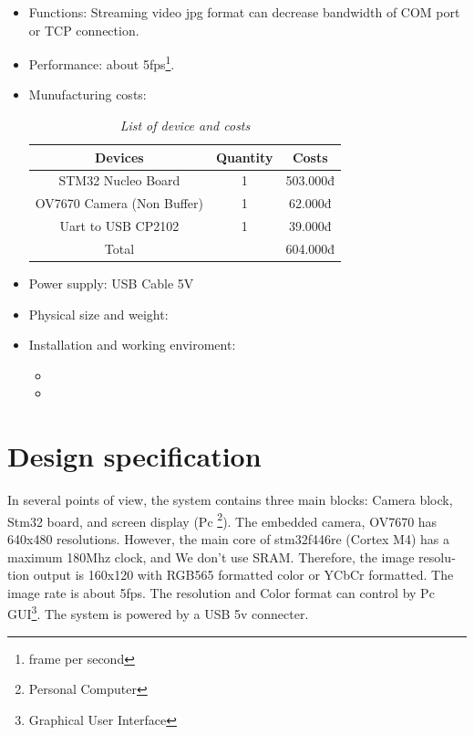 \documentclass[D:/Latex/Internship/Report/Latex/Report.tex]{subfiles}
\begin{document}
\begin{otherlanguage}{english}
\begin{itemize}
					\item Functions: Streaming video jpg format can decrease bandwidth of COM port or TCP connection.

					\item Performance: about 5fps{\footnote {frame per second}}.
					\item Munufacturing costs: 
					\vspace{0.2cm}
					\begin{table}[h!]
						\label{tab:listofdevice}
						\centering
						\large
						\caption{\it List of device and costs}
						\vspace{12pt}
							\begin{tabular}{|c | c | c|}
								\hline 
								Devices & Quantity & Costs \\
								\hline
								STM32 Nucleo Board & 1 & 503.000đ 	\\
								\hline
								OV7670 Camera (Non Buffer) &	1 &	  62.000đ	\\
								\hline
								Uart to USB CP2102	&	1 		& 39.000đ \\
								\hline
								Total & &604.000đ	\\
								\hline
								\end{tabular}	
					\end{table}
					\item Power supply: USB Cable 5V 
					\item Physical size and weight:
					\item Installation and working enviroment:
					\begin{itemize}
						\item 
						\item
					
					\end{itemize}
				\end{itemize}

			\newpage
			\section{Design specification}
			\label{sec:Design}

					\normalsize
					In several points of view, the system contains three main blocks: Camera block, Stm32 board, and screen display (Pc {\footnote{Personal Computer}}). The embedded camera, OV7670 has 640x480 resolutions. However, the main core of stm32f446re (Cortex M4) has a maximum 180Mhz clock, and We don't use SRAM. Therefore, the image resolution output is 160x120 with RGB565 formatted color or YCbCr formatted. The image rate is about 5fps. The resolution and Color format can control by Pc GUI{\footnote{Graphical User Interface}}.  The system is powered by a USB 5v connecter.


\end{otherlanguage}
\end{document}
